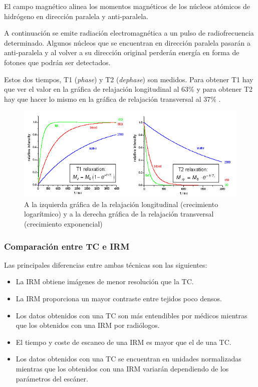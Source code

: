 El campo magnético alinea los momentos magnéticos de los núcleos atómicos de hidrógeno en dirección paralela y anti-paralela. 

A continuación se emite radiación electromagnética a un pulso de radiofrecuencia determinado. Algunos núcleos que se encuentran en dirección paralela pasarán a anti-paralela y al volver a su dirección original perderán energía en forma de fotones que podrán ser detectados. 

Estos dos tiempos, T1 (\textit{phase}) y T2 (\textit{dephase}) son medidos. Para obtener T1 hay que ver el valor en la gráfica de relajación longitudinal al 63\% y para obtener T2 hay que hacer lo mismo en la gráfica de relajación transversal al 37\% \cite{relaxation}.

\begin{figure}[H]
	\centering
	\includegraphics[width=12cm]{imagenes/desarrollo/relajacion-longitudinal-transversal}
	\caption{A la izquierda gráfica de la relajación longitudinal (crecimiento logarítmico) y a la derecha gráfica de la relajación transversal (crecimiento exponencial) \cite{relaxation}}
	\label{fig:desarrollo/relajacion-longitudinal-transversal}
\end{figure}

\subsubsection{Comparación entre TC e IRM}

Las principales diferencias entre ambas técnicas son las siguientes:

\begin{itemize}
	\item La IRM obtiene imágenes de menor resolución que la TC.
	\item La IRM proporciona un mayor contraste entre tejidos poco densos.
	\item Los datos obtenidos con una TC son más entendibles por médicos mientras que los obtenidos con una IRM por radiólogos.
	\item El tiempo y coste de escaneo de una IRM es mayor que el de una TC.
	\item Los datos obtenidos con una TC se encuentran en unidades normalizadas mientras que los obtenidos con una IRM variarán dependiendo de los parámetros del escáner.
\end{itemize}

